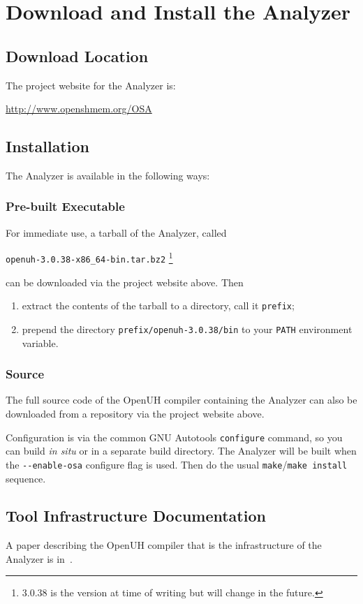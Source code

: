 \section{Download and Install the \openshmem Analyzer}
\label{chapter:download}

\subsection{Download Location}

The project website for the \openshmem Analyzer is:

\begin{center}
\url{http://www.openshmem.org/OSA}
\end{center}

\subsection{Installation}

The \openshmem Analyzer is available in the following ways:

\subsubsection{Pre-built Executable}

For immediate use, a tarball of the \openshmem Analyzer, called
\begin{center}
\texttt{openuh-3.0.38-x86\_64-bin.tar.bz2}
\footnote{3.0.38 is the version at time of writing but will change in
  the future.}
\end{center}
can be downloaded via the project website above.  Then

\begin{enumerate}
\item extract the contents of the tarball to a directory, call it
  \texttt{prefix};
\item prepend the directory \texttt{prefix/openuh-3.0.38/bin} to your
  \texttt{PATH} environment variable.
\end{enumerate}

\subsubsection{Source}

The full source code of the OpenUH compiler containing the \openshmem
Analyzer can also be downloaded from a repository via the project
website above.

Configuration is via the common GNU Autotools \texttt{configure}
command, so you can build \emph{in situ} or in a separate build
directory.  The \openshmem Analyzer will be built when the
\texttt{-{}-{}enable-osa} configure flag is used.  Then do the usual
\texttt{make}/\texttt{make install} sequence.

\subsection{Tool Infrastructure Documentation}

A paper describing the OpenUH compiler that is the infrastructure of
the \openshmem Analyzer is in~\cite{chapman2012experiencesspringer}.
